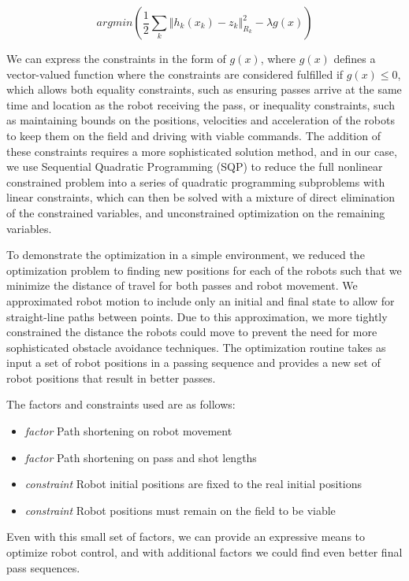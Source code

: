 \documentclass[a4paper, 10pt, conference]{ieeeconf}      %
\begin{document}
\begin{equation} \label{constraints}
 argmin(\frac{1}{2}\sum_{k}\left\Vert h_{k}(x_{k})-z_{k}\right\Vert _{R_{k}}^{2}-\lambda g(x))
\end{equation} 

We can express the constraints in the form of $g(x)$, where $g(x)$ defines a vector-valued function where the constraints are considered fulfilled if $g(x)\leq 0$, which allows both equality constraints, such as ensuring passes arrive at the same time and location as the robot receiving the pass, or inequality constraints, such as maintaining bounds on the positions, velocities and acceleration of the robots to keep them on the field and driving with viable commands.  The addition of these constraints requires a more sophisticated solution method, and in our case, we use Sequential Quadratic Programming (SQP) to reduce the full nonlinear constrained problem into a series of quadratic programming subproblems with linear constraints, which can then be solved with a mixture of direct elimination of the constrained variables, and unconstrained optimization on the remaining variables\cite{Fletcher87book}. 

To demonstrate the optimization in a simple environment, we reduced the optimization problem to finding new positions for each of the robots such that we minimize the distance of travel for both passes and robot movement.  We approximated robot motion to include only an initial and final state to allow for straight-line paths between points.  Due to this approximation, we more tightly constrained the distance the robots could move to prevent the need for more sophisticated obstacle avoidance techniques.  The optimization routine takes as input a set of robot positions in a passing sequence and provides a new set of robot positions that result in better passes.  

The factors and constraints used are as follows:
\begin{itemize}
 \item \textit{factor} Path shortening on robot movement
 \item \textit{factor} Path shortening on pass and shot lengths
 \item \textit{constraint} Robot initial positions are fixed to the real initial positions
 \item \textit{constraint} Robot positions must remain on the field to be viable
\end{itemize}

Even with this small set of factors, we can provide an expressive means to optimize robot control, and with additional factors we could find even better final pass sequences.  
\end{document}
